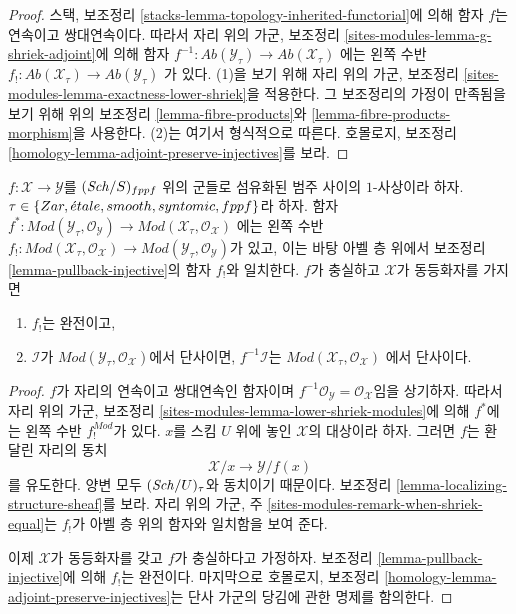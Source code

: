 \begin{proof}
스택, 보조정리 \ref{stacks-lemma-topology-inherited-functorial}에 의해
함자 $f$는 연속이고 쌍대연속이다. 따라서 자리 위의 가군, 보조정리
\ref{sites-modules-lemma-g-shriek-adjoint}에 의해 함자
$f^{-1} : \textit{Ab}(\mathcal{Y}_\tau) \to \textit{Ab}(\mathcal{X}_\tau)$
에는 왼쪽 수반
$f_! : \textit{Ab}(\mathcal{X}_\tau) \to \textit{Ab}(\mathcal{Y}_\tau)$
가 있다. (1)을 보기 위해 자리 위의 가군, 보조정리
\ref{sites-modules-lemma-exactness-lower-shriek}을 적용한다.
그 보조정리의 가정이 만족됨을 보기 위해 위의 보조정리
\ref{lemma-fibre-products}와
\ref{lemma-fibre-products-morphism}을 사용한다.
(2)는 여기서 형식적으로 따른다. 호몰로지, 보조정리
\ref{homology-lemma-adjoint-preserve-injectives}를 보라.
\end{proof}

\begin{lemma}
\label{lemma-pullback-injective-modules}
$f : \mathcal{X} \to \mathcal{Y}$를 $(\mathit{Sch}/S)_{fppf}$ 위의
군들로 섬유화된 범주 사이의 $1$-사상이라 하자.
$\tau \in \{Zar, {\acute{e}tale}, smooth, syntomic, fppf\}$라 하자. 함자
$f^* : \textit{Mod}(\mathcal{Y}_\tau, \mathcal{O}_\mathcal{Y}) \to
\textit{Mod}(\mathcal{X}_\tau, \mathcal{O}_\mathcal{X})$
에는 왼쪽 수반
$f_! : \textit{Mod}(\mathcal{X}_\tau, \mathcal{O}_\mathcal{X}) \to
\textit{Mod}(\mathcal{Y}_\tau, \mathcal{O}_\mathcal{Y})$가 있고,
이는 바탕 아벨 층 위에서 보조정리
\ref{lemma-pullback-injective}의 함자 $f_!$와 일치한다.
$f$가 충실하고 $\mathcal{X}$가 동등화자를 가지면
\begin{enumerate}
\item $f_!$는 완전이고,
\item $\mathcal{I}$가
$\textit{Mod}(\mathcal{Y}_\tau, \mathcal{O}_\mathcal{X})$에서 단사이면,
$f^{-1}\mathcal{I}$는
$\textit{Mod}(\mathcal{X}_\tau, \mathcal{O}_\mathcal{X})$
에서 단사이다.
\end{enumerate}
\end{lemma}

\begin{proof}
$f$가 자리의 연속이고 쌍대연속인 함자이며
$f^{-1}\mathcal{O}_\mathcal{Y} = \mathcal{O}_\mathcal{X}$임을 상기하자.
따라서 자리 위의 가군, 보조정리
\ref{sites-modules-lemma-lower-shriek-modules}에 의해
$f^*$에는 왼쪽 수반 $f_!^{Mod}$가 있다.
$x$를 스킴 $U$ 위에 놓인 $\mathcal{X}$의 대상이라 하자.
그러면 $f$는 환 달린 자리의 동치
$$
\mathcal{X}/x \longrightarrow \mathcal{Y}/f(x)
$$
를 유도한다. 양변 모두 $(\mathit{Sch}/U)_\tau$와 동치이기 때문이다.
보조정리 \ref{lemma-localizing-structure-sheaf}를 보라.
자리 위의 가군, 주
\ref{sites-modules-remark-when-shriek-equal}는
$f_!$가 아벨 층 위의 함자와 일치함을 보여 준다.

\medskip\noindent
이제 $\mathcal{X}$가 동등화자를 갖고 $f$가 충실하다고 가정하자.
보조정리 \ref{lemma-pullback-injective}에 의해 $f_!$는 완전이다.
마지막으로 호몰로지, 보조정리
\ref{homology-lemma-adjoint-preserve-injectives}는 단사 가군의
당김에 관한 명제를 함의한다.
\end{proof}




